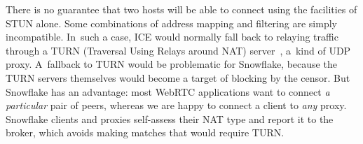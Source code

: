 \documentclass[letterpaper,twocolumn]{article}
\begin{document}
There is no guarantee that two hosts will be able to
connect using the facilities of STUN alone.
Some combinations of address mapping and
filtering are simply incompatible.
In~such a case,
ICE would normally fall back to relaying traffic through a
TURN (Traversal Using Relays around NAT) server~\cite{rfc8656},
a~kind of UDP proxy.
A~fallback to TURN would be problematic for Snowflake,
because the TURN servers themselves
would become a target of blocking by the censor.
But Snowflake has an advantage:
most WebRTC applications want to connect \emph{a particular} pair of peers,
whereas we are happy to connect a client to \emph{any} proxy.
Snowflake clients and proxies self-assess their NAT type
and report it to the broker,
which avoids making matches
that would require TURN.

\end{document}
